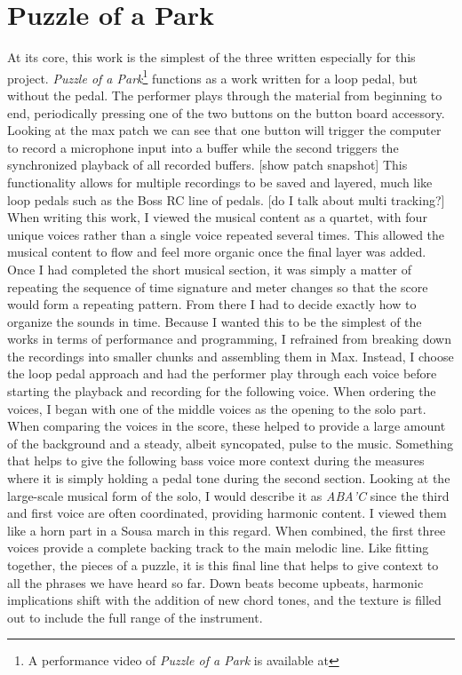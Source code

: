 \section{Puzzle of a Park}
At its core, this work is the simplest of the three written especially for this project. \textit{Puzzle of a Park}\footnote{A performance video of \textit{Puzzle of a Park} is available at} functions as a work written for a loop pedal, but without the pedal. The performer plays through the material from beginning to end, periodically pressing one of the two buttons on the button board accessory. Looking at the max patch we can see that one button will trigger the computer to record a microphone input into a buffer while the second triggers the synchronized playback of all recorded buffers. 
[show patch snapshot]
This functionality allows for multiple recordings to be saved and layered, much like loop pedals such as the Boss RC line of pedals. [do I talk about multi tracking?]
When writing this work, I viewed the musical content as a quartet, with four unique voices rather than a single voice repeated several times. This allowed the musical content to flow and feel more organic once the final layer was added. 
Once I had completed the short musical section, it was simply a matter of repeating the sequence of time signature and meter changes so that the score would form a repeating pattern. From there I had to decide exactly how to organize the sounds in time. Because I wanted this to be the simplest of the works in terms of performance and programming, I refrained from breaking down the recordings into smaller chunks and assembling them in Max. Instead, I choose the loop pedal approach and had the performer play through each voice before starting the playback and recording for the following voice. 
When ordering the voices, I began with one of the middle voices as the opening to the solo part. When comparing the voices in the score, these helped to provide a large amount of the background and a steady, albeit syncopated, pulse to the music. Something that helps to give the following bass voice more context during the measures where it is simply holding a pedal tone during the second section. Looking at the large-scale musical form of the solo, I would describe it as \emph{ABA'C} since the third and first voice are often coordinated, providing harmonic content. I viewed them like a horn part in a Sousa march in this regard. When combined, the first three voices provide a complete backing track to the main melodic line. Like fitting together, the pieces of a puzzle, it is this final line that helps to give context to all the phrases we have heard so far. Down beats become upbeats, harmonic implications shift with the addition of new chord tones, and the texture is filled out to include the full range of the instrument.


